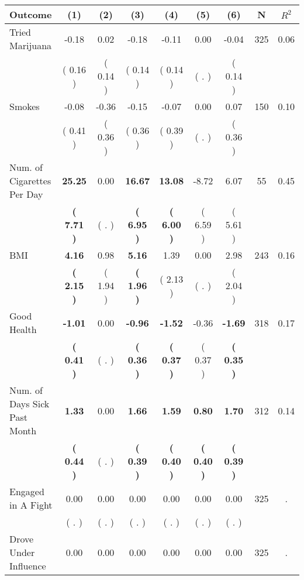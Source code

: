 \begin{tabular}{lcccccccc}
\toprule
 \textbf{Outcome} & \textbf{(1)} & \textbf{(2)} & \textbf{(3)} & \textbf{(4)} & \textbf{(5)} & \textbf{(6)} & \textbf{N} & \textbf{$ R^2$} \\
\midrule
Tried Marijuana &     -0.18 &      0.02 &     -0.18 &     -0.11 &      0.00 &     -0.04 & 325 &       0.06 \\ 
 & (     0.16 ) & (     0.14 ) & (     0.14 ) & (     0.14 ) & (        . ) & (     0.14 ) & \\
Smokes &     -0.08 &     -0.36 &     -0.15 &     -0.07 &      0.00 &      0.07 & 150 &       0.10 \\ 
 & (     0.41 ) & (     0.36 ) & (     0.36 ) & (     0.39 ) & (        . ) & (     0.36 ) & \\
Num. of Cigarettes Per Day & \textbf{    25.25} &      0.00 & \textbf{    16.67} & \textbf{    13.08} &     -8.72 &      6.07 & 55 &       0.45 \\ 
 & \textbf{(     7.71 )} & (        . ) & \textbf{(     6.95 )} & \textbf{(     6.00 )} & (     6.59 ) & (     5.61 ) & \\
BMI & \textbf{     4.16} &      0.98 & \textbf{     5.16} &      1.39 &      0.00 &      2.98 & 243 &       0.16 \\ 
 & \textbf{(     2.15 )} & (     1.94 ) & \textbf{(     1.96 )} & (     2.13 ) & (        . ) & (     2.04 ) & \\
Good Health & \textbf{    -1.01} &      0.00 & \textbf{    -0.96} & \textbf{    -1.52} &     -0.36 & \textbf{    -1.69} & 318 &       0.17 \\ 
 & \textbf{(     0.41 )} & (        . ) & \textbf{(     0.36 )} & \textbf{(     0.37 )} & (     0.37 ) & \textbf{(     0.35 )} & \\
Num. of Days Sick Past Month & \textbf{     1.33} &      0.00 & \textbf{     1.66} & \textbf{     1.59} & \textbf{     0.80} & \textbf{     1.70} & 312 &       0.14 \\ 
 & \textbf{(     0.44 )} & (        . ) & \textbf{(     0.39 )} & \textbf{(     0.40 )} & \textbf{(     0.40 )} & \textbf{(     0.39 )} & \\
Engaged in A Fight &      0.00 &      0.00 &      0.00 &      0.00 &      0.00 &      0.00 & 325 &          . \\ 
 & (        . ) & (        . ) & (        . ) & (        . ) & (        . ) & (        . ) & \\
Drove Under Influence &      0.00 &      0.00 &      0.00 &      0.00 &      0.00 &      0.00 & 325 &          . \\ 

\end{tabular}
